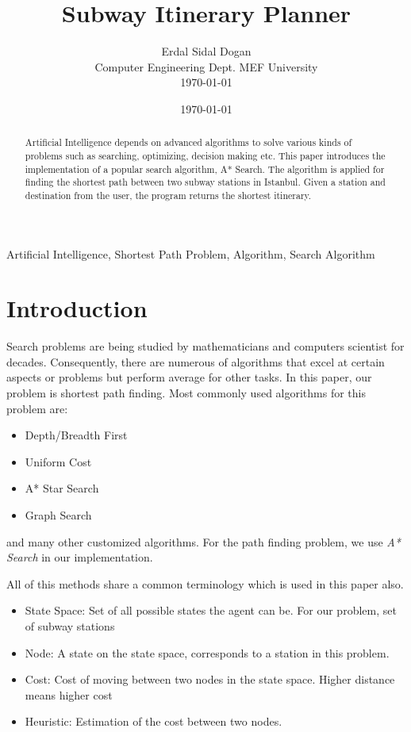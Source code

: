 \documentclass{IEEEtran}
\author{Erdal Sidal Dogan \\ Computer Engineering Dept. MEF University \\ \today}
\date{\today}
\title{Subway Itinerary Planner}
\begin{document}
	\maketitle
	\begin{abstract}
		Artificial Intelligence depends on advanced algorithms to solve various kinds of problems such as searching, optimizing, decision making etc. This paper introduces the implementation of a popular search algorithm, A* Search. The algorithm is applied for finding the shortest path between two subway stations in Istanbul. Given a station and destination from the user, the program returns the shortest itinerary.
	\end{abstract}
	
	\begin{IEEEkeywords}
		Artificial Intelligence, Shortest Path Problem, Algorithm, Search Algorithm
	\end{IEEEkeywords}

	\section{Introduction}
	
	Search problems are being studied by mathematicians and computers scientist for decades. Consequently, there are numerous of algorithms that excel at certain aspects or problems but perform average for other tasks. In this paper, our problem is shortest path finding. Most commonly used algorithms for this problem are:
	\begin{itemize}
		\item Depth/Breadth First
		\item Uniform Cost
		\item A* Star Search
		\item Graph Search
	\end{itemize}
	and many other customized algorithms. For the path finding problem, we use \textit{A* Search} in our implementation. \newline \par
	
	All of this methods share a common terminology which is used in this paper also.
	
	\begin{itemize}
		\item State Space: Set of all possible states the agent can be. For our problem, set of subway stations
		\item Node: A state on the state space, corresponds to a station in this problem.
		\item Cost: Cost of moving between two nodes in the state space. Higher distance means higher cost
		\item Heuristic: Estimation of the cost between two nodes.
	\end{itemize}
		
\end{document}
